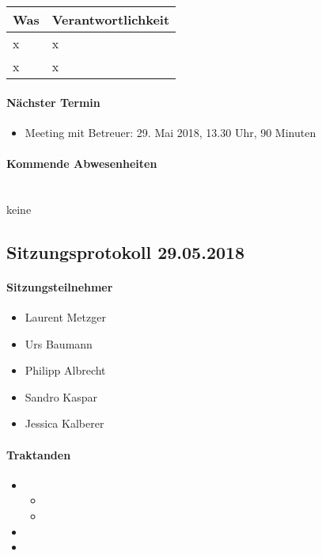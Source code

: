 \begin{table}[H]
	\centering
	\begin{tabularx}{\textwidth}{X | p{4.5cm}}
		\rowcolor{gray!50}
		\textbf{Was} & \textbf{Verantwortlichkeit} \\
		\hline
		x & x \\
		x & x \\
	\end{tabularx}
	\label{tab:my-label}
\end{table}

\paragraph{Nächster Termin}
\begin{itemize}	
	\item Meeting mit Betreuer: 29. Mai 2018, 13.30 Uhr, 90 Minuten
\end{itemize}

\paragraph{Kommende Abwesenheiten} \mbox{}\\
keine


\newpage


\subsection{Sitzungsprotokoll 29.05.2018}

\paragraph{Sitzungsteilnehmer}
\begin{itemize}	
	\item Laurent Metzger 
	\item Urs Baumann
	\item Philipp Albrecht
	\item Sandro Kaspar
	\item Jessica Kalberer
\end{itemize}

\paragraph{Traktanden}
\begin{itemize}	
	\item 
	\begin{itemize}
		\item 
		\item 
	\end{itemize}
	\item 
	\item 
\end{itemize}


